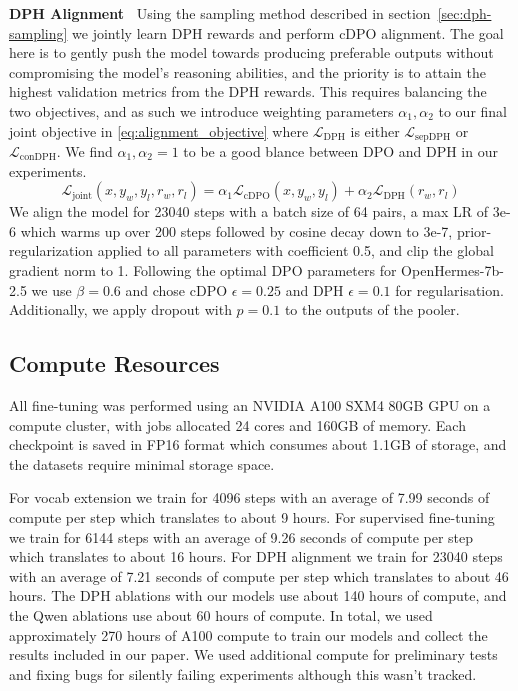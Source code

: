 \textbf{DPH Alignment\ } Using the sampling method described in section~\ref{sec:dph-sampling} we jointly learn DPH rewards and perform cDPO alignment. The goal here is to gently push the model towards producing preferable outputs without compromising the model's reasoning abilities, and the priority is to attain the highest validation metrics from the DPH rewards. This requires balancing the two objectives, and as such we introduce weighting parameters $\alpha_1, \alpha_2$ to our final joint objective in \eqref{eq:alignment_objective} where $\mathcal{L}_\text{DPH}$ is either $\mathcal{L}_\text{sepDPH}$ or $\mathcal{L}_\text{conDPH}$. We find $\alpha_1,\alpha_2=1$ to be a good blance between DPO and DPH in our experiments.
\begin{equation} \label{eq:alignment_objective}
    \mathcal{L}_\text{joint}(x,y_w,y_l,r_w,r_l) =
    \alpha_1 \mathcal{L}_\text{cDPO}(x,y_w,y_l) +
    \alpha_2 \mathcal{L}_\text{DPH}(r_w,r_l)
\end{equation}
We align the model for 23040 steps with a batch size of 64 pairs, a max LR of 3e-6 which warms up over 200 steps followed by cosine decay down to 3e-7, prior-regularization applied to all parameters with coefficient 0.5, and clip the global gradient norm to 1. Following the optimal DPO parameters for OpenHermes-7b-2.5 \cite{pref-tuning} we use $\beta=0.6$ and chose cDPO $\epsilon=0.25$ and DPH $\epsilon=0.1$ for regularisation. Additionally, we apply dropout with $p=0.1$ to the outputs of the pooler.

\subsection{Compute Resources}
All fine-tuning was performed using an NVIDIA A100 SXM4 80GB GPU on a compute cluster, with jobs allocated 24 cores and 160GB of memory. Each checkpoint is saved in FP16 format which consumes about 1.1GB of storage, and the datasets require minimal storage space.

For vocab extension we train for 4096 steps with an average of 7.99 seconds of compute per step which translates to about 9 hours. For supervised fine-tuning we train for 6144 steps with an average of 9.26 seconds of compute per step which translates to about 16 hours. For DPH alignment we train for 23040 steps with an average of 7.21 seconds of compute per step which translates to about 46 hours. The DPH ablations with our models use about 140 hours of compute, and the Qwen ablations use about 60 hours of compute. In total, we used approximately 270 hours of A100 compute to train our models and collect the results included in our paper. We used additional compute for preliminary tests and fixing bugs for silently failing experiments although this wasn't tracked.